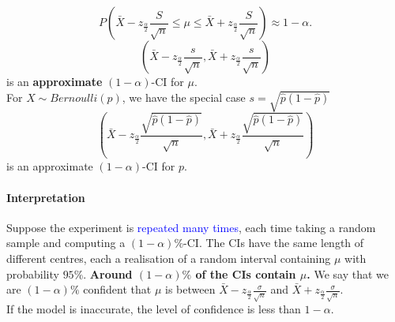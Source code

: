 \[P\left(\bar{X}-z_{\frac{\alpha}{2}}\frac{S}{\sqrt{n}}\le \mu\le \bar{X}+z_{\frac{\alpha}{2}}\frac{S}{\sqrt{n}}\right)\approx1-\alpha.\]
\[\left(\bar{X}-z_{\frac{\alpha}{2}}\frac{s}{\sqrt{n}}, \bar{X}+z_{\frac{\alpha}{2}}\frac{s}{\sqrt{n}}\right)\]
is an \textbf{approximate} $\left( 1-\alpha \right) $-CI for $\mu$.\\
For $X \sim Bernoulli(p)$, we have the special case $s=\sqrt{\hat{p}\left( 1-\hat{p} \right) }$
\[\left(\bar{X}-z_{\frac{\alpha}{2}}\frac{\sqrt{\hat{p}\left( 1-\hat{p} \right) }}{\sqrt{n}}, \bar{X}+z_{\frac{\alpha}{2}}\frac{\sqrt{\hat{p}\left( 1-\hat{p} \right) }}{\sqrt{n}}\right)\]
is an approximate $\left( 1-\alpha \right) $-CI for $p$.


\paragraph{Interpretation}
Suppose the experiment is \textcolor{Blue}{repeated many times}, each time
taking a random sample and computing a $\left( 1-\alpha \right)\%$-CI\@. The
CIs have the same length of different centres, \textcolor{Bittersweet}{each a
realisation of a random interval} containing $\mu$ with probability $95\%$.
\textbf{Around $\left( 1-\alpha \right)\%$ of the CIs contain $\mu$.}
We say that we are $(1-\alpha)\%$ \textcolor{Bittersweet}{confident} that $\mu$ is between 
$\bar{X}-z_{\frac{\alpha}{2}}\frac{\sigma}{\sqrt{n}}$ and $\bar{X}+z_{\frac{\alpha}{2}}\frac{\sigma}{\sqrt{n}}$.\\
If the model is inaccurate, the level of confidence is less than $1-\alpha$.
